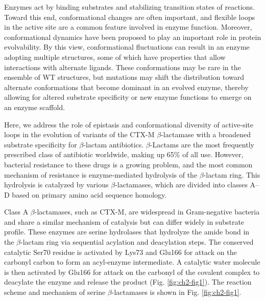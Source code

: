 \documentclass[../main.tex]{subfiles}
\begin{document}
        Enzymes act by binding substrates and stabilizing transition states of reactions\cite{knowles_enzyme_1991}. Toward this end, conformational changes are often important, and flexible loops in the active site are a common feature involved in enzyme function\cite{dellus-gur_what_2013,doucet_flexibility_2009,whittier_conformational_2013}. Moreover, conformational dynamics have been proposed to play an important role in protein evolvability\cite{james_conformational_2003,tokuriki_protein_2009}. By this view, conformational fluctuations can result in an enzyme adopting multiple structures, some of which have properties that allow interactions with alternate ligands. These conformations may be rare in the ensemble of WT structures, but mutations may shift the distribution toward alternate conformations that become dominant in an evolved enzyme, thereby allowing for altered substrate specificity or new enzyme functions to emerge on an enzyme scaffold\cite{tokuriki_protein_2009,petrovic_conformational_2018}.

        Here, we address the role of epistasis and conformational diversity of active-site loops in the evolution of variants of the CTX-M $\beta$-lactamase with a broadened substrate specificity for $\beta$-lactam antibiotics. $\beta$-Lactams are the most frequently prescribed class of antibiotic worldwide, making up 65\% of all use\cite{livermore_-lactamase_2006}. However, bacterial resistance to these drugs is a growing problem, and the most common mechanism of resistance is enzyme-mediated hydrolysis of the $\beta$-lactam ring\cite{fisher_bacterial_2005}. This hydrolysis is catalyzed by various $\beta$-lactamases, which are divided into classes A–D based on primary amino acid sequence homology\cite{fisher_bacterial_2005,ambler_standard_1991}.

        Class A $\beta$-lactamases, such as CTX-M, are widespread in Gram-negative bacteria and share a similar mechanism of catalysis but can differ widely in substrate profile\cite{bush_epidemiological_2011,palzkill_structural_2018}. These enzymes are serine hydrolases that hydrolyze the amide bond in the $\beta$-lactam ring via sequential acylation and deacylation steps. The conserved catalytic Ser70 residue is activated by Lys73 and Glu166 for attack on the carbonyl carbon to form an acyl-enzyme intermediate. A catalytic water molecule is then activated by Glu166 for attack on the carbonyl of the covalent complex to deacylate the enzyme and release the product (Fig. \ref{fig:ch2-fig1})\cite{palzkill_structural_2018,mobashery_three_2009,bonomo_kinetics_2007}. The reaction scheme and mechanism of serine $\beta$-lactamases is shown in Fig. \ref{fig:ch2-fig1}.
\end{document}
